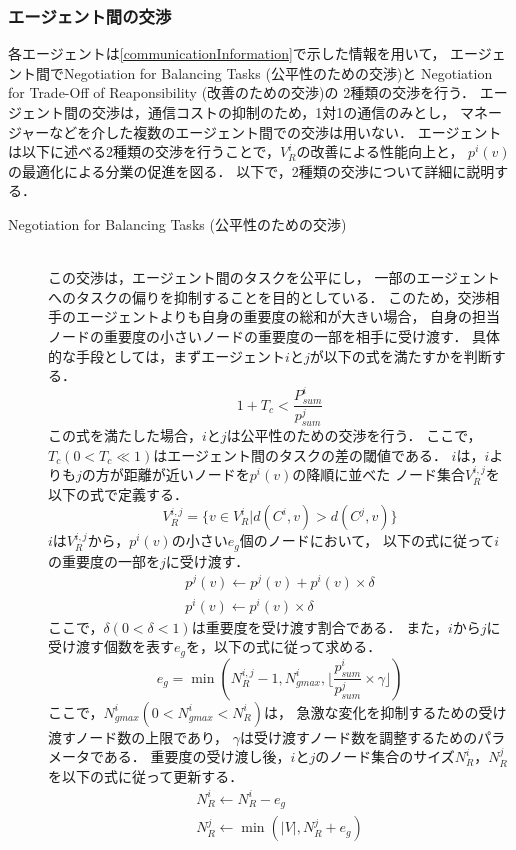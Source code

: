 \documentclass[12pt,a4j,twoside]{jarticle}
\begin{document}
  \subsubsection{エージェント間の交渉}
  各エージェントは\ref{communicationInformation}で示した情報を用いて，
  エージェント間でNegotiation for Balancing Tasks (公平性のための交渉)と
  Negotiation for Trade-Off of Reaponsibility (改善のための交渉)の
  2種類の交渉を行う．
  エージェント間の交渉は，通信コストの抑制のため，1対1の通信のみとし，
  マネージャーなどを介した複数のエージェント間での交渉は用いない．
  エージェントは以下に述べる2種類の交渉を行うことで，$V^i_R$の改善による性能向上と，
  $p^i(v)$の最適化による分業の促進を図る．
  以下で，2種類の交渉について詳細に説明する．
  \begin{description}
    \item[Negotiation for Balancing Tasks (公平性のための交渉)]\mbox{}\\
      この交渉は，エージェント間のタスクを公平にし，
      一部のエージェントへのタスクの偏りを抑制することを目的としている．
      このため，交渉相手のエージェントよりも自身の重要度の総和が大きい場合，
      自身の担当ノードの重要度の小さいノードの重要度の一部を相手に受け渡す．
      具体的な手段としては，まずエージェント$i$と$j$が以下の式を満たすかを判断する．
      \begin{equation}
        1 + T_c < \dfrac{P^i_{sum}}{p^j_{sum}}
      \end{equation}
      この式を満たした場合，$i$と$j$は公平性のための交渉を行う．
      ここで，$T_c(0 < T_c \ll 1)$はエージェント間のタスクの差の閾値である．
      $i$は，$i$よりも$j$の方が距離が近いノードを$p^i(v)$の降順に並べた
      ノード集合$V^{i, j}_R$を以下の式で定義する．
      \begin{equation}
        V^{i, j}_R = \{v \in V^i_R|d(C^i, v) > d(C^j, v)\}  
      \end{equation}
      $i$は$V^{i, j}_R$から，$p^i(v)$の小さい$e_g$個のノードにおいて，
      以下の式に従って$i$の重要度の一部を$j$に受け渡す．
      \begin{eqnarray}
        p^j(v) \gets p^j(v) + p^i(v) \times \delta \\
        p^i(v) \gets p^i(v) \times \delta
      \end{eqnarray}
      ここで，$\delta(0 < \delta < 1)$は重要度を受け渡す割合である．
      また，$i$から$j$に受け渡す個数を表す$e_g$を，以下の式に従って求める．
      \begin{equation}
        e_g = \min(N^{i, j}_R - 1, N^i_{gmax}, \lfloor \dfrac{p^i_{sum}}{p^j_{sum}} \times \gamma \rfloor)
      \end{equation}
      ここで，$N^i_{gmax}(0 < N^i_{gmax} < N^i_R)$は，
      急激な変化を抑制するための受け渡すノード数の上限であり，
      $\gamma$は受け渡すノード数を調整するためのパラメータである．
      重要度の受け渡し後，$i$と$j$のノード集合のサイズ$N^i_R$，$N^j_R$を以下の式に従って更新する．
      \begin{eqnarray}
        N^i_R \gets N^i_R - e_g \\
        N^j_R \gets \min(|V|, N^j_R+e_g)
      \end{eqnarray}


\end{description}
\end{document}
